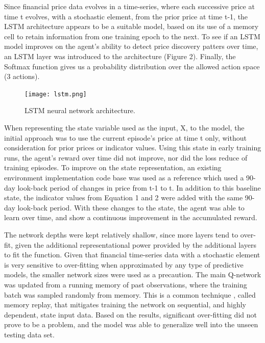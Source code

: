 \documentclass[10pt,twocolumn,letterpaper]{article}
\begin{document}
Since financial price data evolves in a time-series, where each successive price at time t evolves, with a stochastic element, from the prior price at time t-1, the LSTM architecture appears to be a suitable model, based on its use of a memory cell to retain information from one training epoch to the next. To see if an LSTM model improves on the agent's ability to detect price discovery patters over time, an LSTM layer was introduced to the architecture (Figure 2). Finally, the Softmax function gives us a probability distribution over the allowed action space (3 actions).

\begin{figure}[hbt!]
\begin{center}
     \texttt{[image: lstm.png]}
     \caption{LSTM neural network architecture.}
\end{center}
\end{figure}

When representing the state variable used as the input, X, to the model, the initial approach was to use the current episode's price at time t only, without consideration for prior prices or indicator values. Using this state in early training runs, the agent's reward over time did not improve, nor did the loss reduce of training episodes. To improve on the state representation, an existing environment implementation code base was used as a reference\cite{valuebased} which used a 90-day look-back period of changes in price from t-1 to t. In addition to this baseline state, the indicator values from Equation 1 and 2 were added with the same 90-day look-back period. With these changes to the state, the agent was able to learn over time, and show a continuous improvement in the accumulated reward.

The network depths were kept relatively shallow, since more layers tend to over-fit, given the additional representational power provided by the additional layers to fit the function. Given that financial time-series data with a stochastic element is very sensitive to over-fitting when approximated by any type of predictive models, the smaller network sizes were used as a precaution. The main Q-network was updated from a running memory of past observations, where the training batch was sampled randomly from memory. This is a common technique \cite{playingatari}, called memory replay, that mitigates training the network on sequential, and highly dependent, state input data. Based on the results, significant over-fitting did not prove to be a problem, and the model was able to generalize well into the unseen testing data set.
\end{document}

